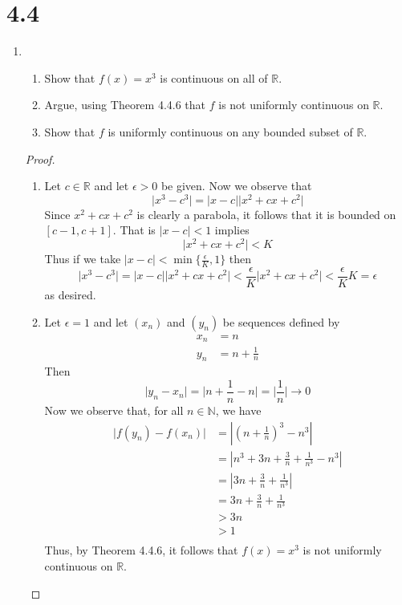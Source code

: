 \section*{4.4}
\begin{enumerate}
    \item \begin{enumerate}
        \item Show that \( f(x) = x^{3} \) is continuous on all of \( \mathbb{R} \).
        
        \item Argue, using Theorem 4.4.6 that \( f \) is not uniformly continuous on \( \mathbb{R} \).
        
        \item Show that \( f \) is uniformly continuous on any bounded subset of \( \mathbb{R} \).
    \end{enumerate}
    
    \begin{proof}
    \begin{enumerate}
        \item Let \( c \in \mathbb{R} \) and let \( \epsilon > 0 \) be given. Now we observe that
        \[
        \vert x^{3} - c^{3} \vert = \vert x-c \vert \vert x^{2}+cx+c^{2} \vert
        \]
        Since \( x^{2}+cx+c^{2} \) is clearly a parabola, it follows that it is bounded on \( [c-1 , c+1] \). That is \( \vert x -c \vert < 1 \) implies 
        \[
        \vert x^{2}+cx+c^{2} \vert < K
        \]
        Thus if we take \( \vert x - c \vert < \min\{\frac{\epsilon}{K}, 1\} \) then 
        \[
         \vert x^{3} - c^{3} \vert = \vert x-c \vert \vert x^{2}+cx+c^{2} \vert < \frac{\epsilon}{K}\vert x^{2}+cx+c^{2} \vert < \frac{\epsilon}{K} K = \epsilon
        \]
        as desired.
        
        \item Let \( \epsilon = 1 \) and let \( (x_{n}) \) and \( (y_{n}) \) be sequences defined by
        \begin{align*}
            x_{n} &= n \\
            y_{n} &= n + \frac{1}{n}
        \end{align*}
        Then
        \[
        \vert y_{n} - x_{n} \vert = \vert n + \frac{1}{n} - n \vert = \vert \frac{1}{n} \vert \rightarrow 0
        \]
        Now we observe that, for all \( n \in \mathbb{N} \), we have
        \begin{align*}
        \vert f(y_{n}) - f(x_{n}) \vert &= \left| \left( n + \frac{1}{n} \right)^{3} - n^{3} \right| \\
        &= \left| n^{3} + 3n + \frac{3}{n} + \frac{1}{n^{3}} - n^{3} \right| \\
        &= \left| 3n + \frac{3}{n} + \frac{1}{n^{3}} \right| \\
        &= 3n + \frac{3}{n} + \frac{1}{n^{3}} \\
        &> 3n \\
        &> 1 \\
        \end{align*}
        Thus, by Theorem 4.4.6, it follows that \( f(x) = x^{3} \) is not uniformly continuous on \( \mathbb{R} \).
        

\end{enumerate}
\end{proof}
\end{enumerate}

